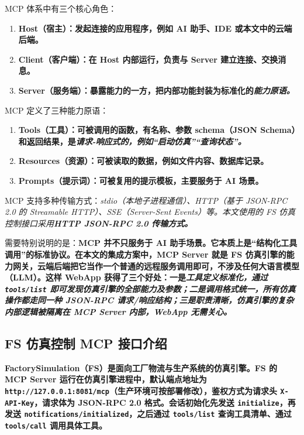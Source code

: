 MCP 体系中有三个核心角色：
\begin{enumerate}[label=\arabic*)]
	\item \bf{Host（宿主）}：发起连接的应用程序，例如 AI 助手、IDE 或本文中的云端后端。
	\item \bf{Client（客户端）}：在 Host 内部运行，负责与 Server 建立连接、交换消息。
	\item \bf{Server（服务端）}：暴露能力的一方，把内部功能封装为标准化的\it{能力原语}。
\end{enumerate}
MCP 定义了三种能力原语：
\begin{enumerate}[label=\arabic*)]
	\item \bf{Tools（工具）}：可被调用的函数，有名称、参数 schema（JSON Schema）和返回结果，是\it{请求-响应}式的，例如“启动仿真”“查询状态”。
	\item \bf{Resources（资源）}：可被读取的数据，例如文件内容、数据库记录。
	\item \bf{Prompts（提示词）}：可被复用的提示模板，主要服务于 AI 场景。
\end{enumerate}
MCP 支持多种传输方式：\it{stdio}（本地子进程通信）、\it{HTTP}（基于 JSON-RPC 2.0 的 Streamable HTTP）、\it{SSE}（Server-Sent Events）等。本文使用的 FS 仿真控制接口采用\bf{HTTP JSON-RPC 2.0} 传输方式。

需要特别说明的是：\bf{MCP 并不只服务于 AI 助手场景}。它本质上是“结构化工具调用”的标准协议。在本文的集成方案中，MCP Server 就是 FS 仿真引擎的能力网关，云端后端把它当作一个普通的远程服务调用即可，不涉及任何大语言模型（LLM）。这样 WebApp 获得了三个好处：一是\it{工具定义标准化}，通过 \texttt{tools/list} 即可发现仿真引擎的全部能力及参数；二是\it{调用格式统一}，所有仿真操作都走同一种 JSON-RPC 请求/响应结构；三是\it{职责清晰}，仿真引擎的复杂内部逻辑被隔离在 MCP Server 内部，WebApp 无需关心。

\subsection{FS 仿真控制 MCP 接口介绍}
\bf{FactorySimulation（FS）}是面向工厂物流与生产系统的仿真引擎。FS 的 MCP Server 运行在仿真引擎进程中，默认端点地址为 \texttt{http://127.0.0.1:8081/mcp}（生产环境可按部署修改），鉴权方式为请求头 \texttt{X-API-Key}，请求体为 JSON-RPC 2.0 格式。会话初始化先发送 \texttt{initialize}，再发送 \texttt{notifications/initialized}，之后通过 \texttt{tools/list} 查询工具清单、通过 \texttt{tools/call} 调用具体工具。

